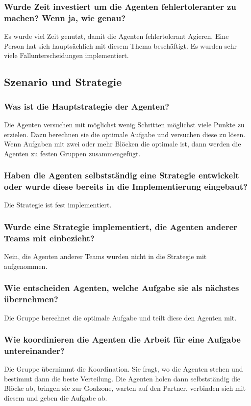 \subsubsection{Wurde Zeit investiert um die Agenten fehlertoleranter zu machen? Wenn ja, wie genau?}
Es wurde viel Zeit genutzt, damit die Agenten fehlertolerant Agieren. Eine Person hat sich hauptsächlich mit diesem Thema beschäftigt. Es wurden sehr viele Fallunterscheidungen implementiert.
\subsection{Szenario und Strategie}
\subsubsection{Was ist die Hauptstrategie der Agenten?}
Die Agenten versuchen mit möglichst wenig Schritten möglichst viele Punkte zu erzielen. Dazu berechnen sie die optimale Aufgabe und versuchen diese zu lösen. Wenn Aufgaben mit zwei oder mehr Blöcken die optimale ist, dann werden die Agenten zu festen Gruppen zusammengefügt.
\subsubsection{Haben die Agenten selbstständig eine Strategie entwickelt oder wurde diese bereits in die Implementierung eingebaut?}
Die Strategie ist fest implementiert.
\subsubsection{Wurde eine Strategie implementiert, die Agenten anderer Teams mit einbezieht?}
Nein, die Agenten anderer Teams wurden nicht in die Strategie mit aufgenommen.
\subsubsection{Wie entscheiden Agenten, welche Aufgabe sie als nächstes übernehmen?}
Die Gruppe berechnet die optimale Aufgabe und teilt diese den Agenten mit.
\subsubsection{Wie koordinieren die Agenten die Arbeit für eine Aufgabe untereinander?}
Die Gruppe übernimmt die Koordination. Sie fragt, wo die Agenten stehen und bestimmt dann die beste Verteilung. Die Agenten holen dann selbstständig die Blöcke ab, bringen sie zur Goalzone, warten auf den Partner, verbinden sich mit diesem und geben die Aufgabe ab.
